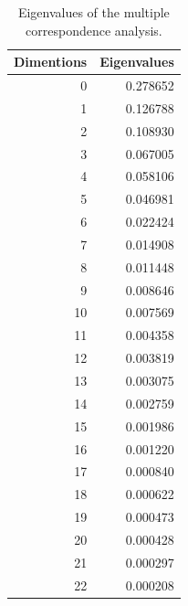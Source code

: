 \documentclass[a4paper,twoside,12pt]{book}
\begin{document}
\begin{appendices}
\begin{table}
\centering
\caption{Eigenvalues of the multiple correspondence analysis.}
\label{id:tab:MCAEigenvalues}
\begin{tabular}{rr}
	\toprule
	 Dimentions &  Eigenvalues \\
	\midrule
			  0 &     0.278652 \\
			  1 &     0.126788 \\
			  2 &     0.108930 \\
			  3 &     0.067005 \\
			  4 &     0.058106 \\
			  5 &     0.046981 \\
			  6 &     0.022424 \\
			  7 &     0.014908 \\
			  8 &     0.011448 \\
			  9 &     0.008646 \\
			 10 &     0.007569 \\
			 11 &     0.004358 \\
			 12 &     0.003819 \\
			 13 &     0.003075 \\
			 14 &     0.002759 \\
			 15 &     0.001986 \\
			 16 &     0.001220 \\
			 17 &     0.000840 \\
			 18 &     0.000622 \\
			 19 &     0.000473 \\
			 20 &     0.000428 \\
			 21 &     0.000297 \\
			 22 &     0.000208 \\
	\bottomrule
	\end{tabular}
\end{table} 


\end{appendices}
\end{document}
